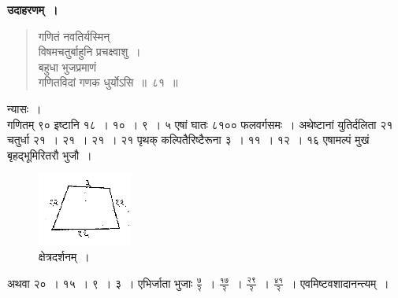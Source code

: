 \documentclass[11pt, openany]{book}
\begin{document}
 \textbf{उदाहरणम्~।} 
\begin{quote}
    \bqt 
     गणितं नवतिर्यस्मिन्\\
विषमचतुर्बाहुनि प्रचक्ष्वाशु~। \\
बहुधा भुजप्रमाणं\\
गणितविदां गणक धुर्योऽसि~॥~८१~॥~
\end{quote}

 न्यासः~। \\

\vspace{-4mm}
 गणितम् ९० इष्टानि १८~। १०~। ९~। ५ एषां घातः ८१०० फलवर्गसमः~। 
अथेष्टानां युतिर्दलिता २१ चतुर्धा २१~। २१~। २१~। २१ पृथक् कल्पितैरिष्टैरूना ३~। ११~। १२~। १६ एषामल्पं मुखं बृहद्भूमिरितरौ भुजौ~। 

\begin{figure}[h!]
     \centering
     \captionsetup{labelformat=empty}
          \caption{क्षेत्रदर्शनम्~।}
\vspace{-2mm}
     \includegraphics[scale=0.85]{graphics/capture128.png}
\end{figure}

\newpage%

 अथवा २०~। १५~। ९~। ३~। एभिर्जाता भुजाः $\frac{\mbox{७}}{\mbox{२}}$~। $\frac{\mbox{१७}}{\mbox{२}}$~। $\frac{\mbox{२९}}{\mbox{२}}$~। $\frac{\mbox{४१}}{\mbox{२}}$~। एवमिष्टवशादानन्त्यम्~। \\
\end{document}
